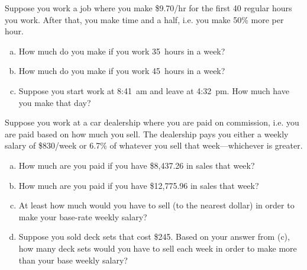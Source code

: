 \documentclass[11pt,letterpaper]{article}
\begin{document}
 Suppose you work a job where you make \$9.70/hr for the first 40 regular hours you work. After that, you make time and a half, i.e. you make 50\% more per hour. 
\begin{enumerate}[(a)]
\item How much do you make if you work 35~hours in a week?
\item How much do you make if you work 45~hours in a week?
\item Suppose you start work at 8:41~am and leave at 4:32~pm. How much have you make that day?
\end{enumerate}



\newpage



 Suppose you work at a car dealership where you are paid on commission, i.e. you are paid based on how much you sell. The dealership pays you either a weekly salary of \$830/week or 6.7\% of whatever you sell that week---whichever is greater.
\begin{enumerate}[(a)]
\item How much are you paid if you have \$8,437.26 in sales that week?
\item How much are you paid if you have \$12,775.96 in sales that week?
\item At least how much would you have to sell (to the nearest dollar) in order to make your base-rate weekly salary?
\item Suppose you sold deck sets that cost \$245. Based on your answer from (c), how many deck sets would you have to sell each week in order to make more than your base weekly salary? 
\end{enumerate}


\end{document}
